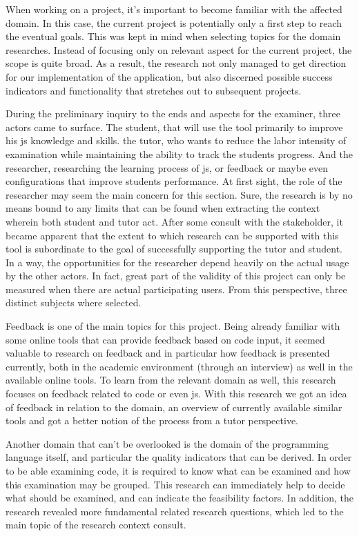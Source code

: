 When working on a project, it's important to become familiar with the affected
domain. In this case, the current project is potentially only a first step to
reach the eventual goals. This was kept in mind when selecting topics for the
domain researches. Instead of focusing only on relevant aspect for the current
project, the scope is quite broad. As a result, the research 
not only managed to get direction for our implementation of the application, 
but also discerned possible success indicators and functionality that stretches 
out to subsequent projects.

During the preliminary inquiry to the ends and aspects for the \gls{examiner},
three actors came to surface. The student, that will use the tool primarily to
improve his \gls{js} knowledge and skills. the tutor, who wants to reduce the
labor intensity of examination while maintaining the ability to track the
students progress. And the researcher, researching the learning process of
\gls{js}, or \gls{feedback} or maybe even configurations that improve students
performance. At first sight, the role of the researcher may seem the main
concern for this section. Sure, the research is by no means bound to any
limits that can be found when extracting the context wherein both student and tutor
act. After some consult with the stakeholder, it became apparent that the
extent to which research can be supported with this tool is subordinate to the
goal of successfully supporting the tutor and student. In a way, the opportunities
for the researcher depend heavily on the actual usage by the other actors.
In fact, great part of the validity of this project can only be measured when 
there are actual participating users. From this perspective, three distinct 
subjects where selected. 

Feedback is one of the main topics for this project. Being already familiar with 
some online tools that can provide \gls{feedback} based on code input, it seemed 
valuable to research on feedback and in particular how \gls{feedback} is 
presented currently, both in the academic environment (through an interview) as 
well in the available online tools. To learn from the relevant domain as well, 
this research focuses on \gls{feedback} related to \gls{code} or even \gls{js}. 
With this research we got an idea of feedback in relation to the domain, an 
overview of currently available similar tools and got a better notion of the 
process from a tutor perspective.

Another domain that can't be overlooked is the domain of the programming
language itself, and particular the quality indicators that can be derived. In
order to be able examining code, it is required to know what can be examined and
how this examination may be grouped. This research can immediately help to 
decide what should be examined, and can indicate the feasibility factors. In
addition, the research revealed more fundamental related research questions, which
led to the main topic of the research context consult.

